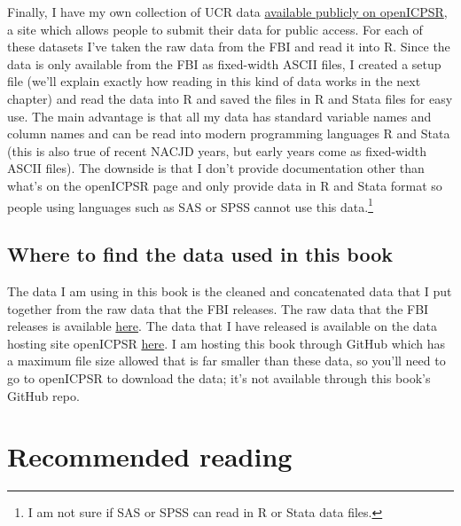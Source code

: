 \documentclass[
  12pt,
  openany]{book}
\begin{document}
Finally, I have my own collection of UCR data \href{https://doi.org/10.3886/E118281V3}{available publicly on openICPSR}, a site which allows people to submit their data for public access. For each of these datasets I've taken the raw data from the FBI and read it into R. Since the data is only available from the FBI as fixed-width ASCII files, I created a setup file (we'll explain exactly how reading in this kind of data works in the next chapter) and read the data into R and saved the files in R and Stata files for easy use. The main advantage is that all my data has standard variable names and column names and can be read into modern programming languages R and Stata (this is also true of recent NACJD years, but early years come as fixed-width ASCII files). The downside is that I don't provide documentation other than what's on the openICPSR page and only provide data in R and Stata format so people using languages such as SAS or SPSS cannot use this data.\footnote{I am not sure if SAS or SPSS can read in R or Stata data files.}

\hypertarget{where-to-find-the-data-used-in-this-book}{%
\subsection{Where to find the data used in this book}\label{where-to-find-the-data-used-in-this-book}}

The data I am using in this book is the cleaned and concatenated data that I put together from the raw data that the FBI releases. The raw data that the FBI releases is available \href{https://crime-data-explorer.fr.cloud.gov/pages/downloads}{here}. The data that I have released is available on the data hosting site openICPSR \href{https://doi.org/10.3886/E118281V3}{here}. I am hosting this book through GitHub which has a maximum file size allowed that is far smaller than these data, so you'll need to go to openICPSR to download the data; it's not available through this book's GitHub repo.

\hypertarget{recommended-reading}{%
\section{Recommended reading}\label{recommended-reading}}
\end{document}
